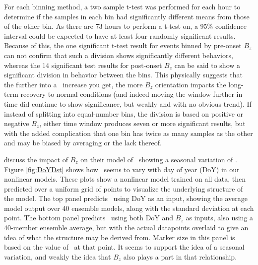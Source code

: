 For each binning method, a two sample t-test was performed for each hour to determine if the samples in each bin had significantly different means from those of the other bin. As there are 73 hours to perform a t-test on, a 95\% confidence interval could be expected to have at least four randomly significant results. Because of this, the one significant t-test result for events binned by pre-onset $B_z$ can not confirm that such a division shows significantly different behaviors, whereas the 14 significant test results for post-onset $B_z$ can be said to show a significant division in behavior between the bins. This physically suggests that the further into a \req\ increase you get, the more $B_z$ orientation impacts the long-term recovery to normal conditions (and indeed moving the window further in time did continue to show significance, but weakly and with no obvious trend). If instead of splitting into equal-number bins, the division is based on positive or negative $B_z$, either time window produces seven or more significant results, but with the added complication that one bin has twice as many samples as the other and may be biased by averaging or the lack thereof. 

\cite{Temerin2002NewModelPredictionDst} discuss the impact of $B_z$ on their model of \dst\ showing a seasonal variation of \dst. Figure \ref{fig:DoYDst} shows how \dst\ seems to vary with day of year (DoY) in our nonlinear models. These plots show a nonlinear model trained on all data, then predicted over a uniform grid of points to visualize the underlying structure of the model. The top panel predicts \dst\ using DoY as an input, showing the average model output over 40 ensemble models, along with the standard deviation at each point. The bottom panel predicts \dst\ using both DoY and $B_z$ as inputs, also using a 40-member ensemble average, but with the actual datapoints overlaid to give an idea of what the structure may be derived from. Marker size in this panel is based on the value of \dst\ at that point. It seems to support the idea of a seasonal variation, and weakly the idea that $B_z$ also plays a part in that relationship.



